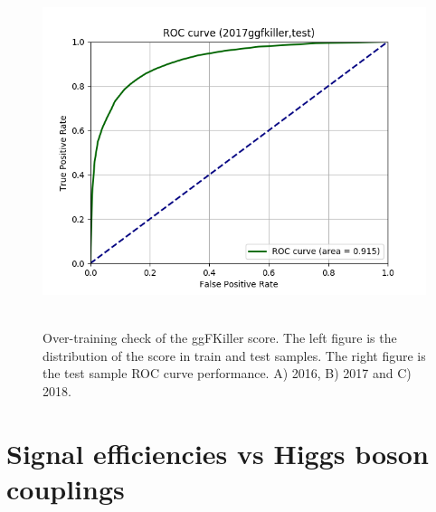 \begin{figure}[htbp!]
\begin{center}
{\includegraphics[width=0.45\linewidth]{Figures/AnalysisStrategy/eventselection/ggfkiller/2017ggfkiller/2017ggfkiller_test_bdt_roc.png}}\\
\\
\end{center}
\caption[Over-training check of the ggFKiller score]{Over-training check of the ggFKiller score. The left figure is the distribution of the score in train and test samples. The right figure is the test sample ROC curve performance. A) 2016, B) 2017 and C) 2018.}
\label{event_selection:fig:ggfkillerper}
\end{figure}

\chapter{Signal efficiencies vs Higgs boson couplings} \label{appendix:efficiencies}

